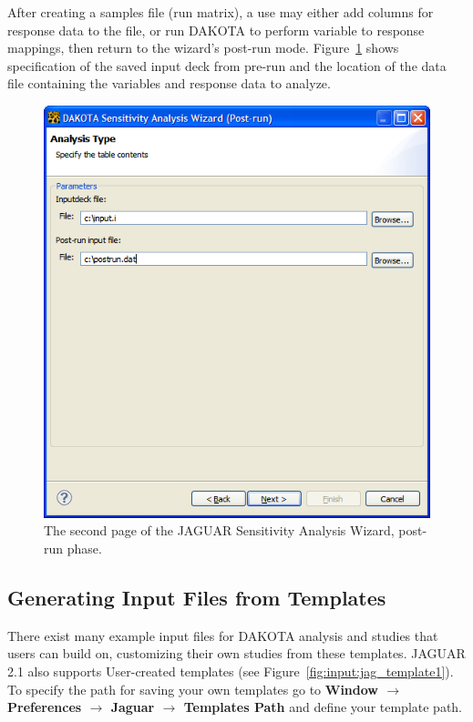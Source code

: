 After creating a samples file (run matrix), a use may either add
columns for response data to the file, or run DAKOTA to perform
variable to response mappings, then return to the wizard's post-run
mode.  Figure~\ref{fig:input:jaguar_sa_post_run} shows specification
of the saved input deck from pre-run and the location of the data file
containing the variables and response data to analyze.
\begin{figure}
  \centering
  \includegraphics[scale=0.5]{images/jaguar_sa_post_run}
  \caption{The second page of the JAGUAR Sensitivity Analysis Wizard,
  post-run phase.}
  \label{fig:input:jaguar_sa_post_run}
\end{figure}

\subsection{Generating Input Files from Templates}

There exist many example input files for DAKOTA analysis and studies
that users can build on, customizing their own studies from these
templates. JAGUAR 2.1 also supports User-created templates (see
Figure~\ref{fig:input:jag_template1}). To specify the path for saving
your own templates go to {\bf Window $\rightarrow$ Preferences
  $\rightarrow$ Jaguar $\rightarrow$ Templates Path} and define your
template path.


